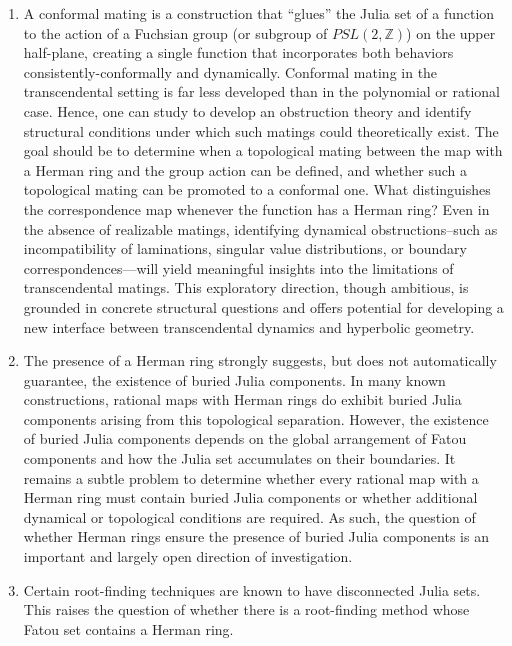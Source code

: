 \documentclass[12pt]{article}
\begin{document}
\begin{enumerate}
	\item A conformal mating is a construction that “glues” the Julia set of a function to the action of a Fuchsian group (or subgroup of $PSL(2,\mathbb{Z})$) on the upper half-plane, creating a single function that incorporates both behaviors consistently-conformally and dynamically. Conformal mating in the transcendental setting is far less developed than in the polynomial or rational case. Hence, one can study to develop an obstruction theory and identify structural conditions under which such matings could theoretically exist. The goal should be to determine when a topological mating between the  map with a Herman ring and the group action can be defined, and whether such a topological mating can be promoted to a conformal one. What distinguishes the correspondence map whenever the function has a Herman ring? Even in the absence of realizable matings, identifying dynamical obstructions--such as incompatibility of laminations, singular value distributions, or boundary correspondences---will yield meaningful insights into the limitations of transcendental matings. This exploratory direction, though ambitious, is grounded in concrete structural questions and offers potential for developing a new interface between transcendental dynamics and hyperbolic geometry.
	
	
	
	
	
	\item The presence of a Herman ring strongly suggests, but does not automatically guarantee, the existence of buried Julia components. In many known constructions, rational maps with Herman rings do exhibit buried Julia components arising from this topological separation. However, the existence of buried Julia components depends on the global arrangement of Fatou components and how the Julia set accumulates on their boundaries. It remains a subtle problem to determine whether every rational map with a Herman ring must contain buried Julia components or whether additional dynamical or topological conditions are required. As such, the question of whether Herman rings ensure the presence of buried Julia components is an important and largely open direction of investigation.
	
	\item Certain root-finding techniques are known to have disconnected Julia sets. This raises the question of whether there is a root-finding method whose Fatou set contains a Herman ring.
	

\end{enumerate}
\end{document}
